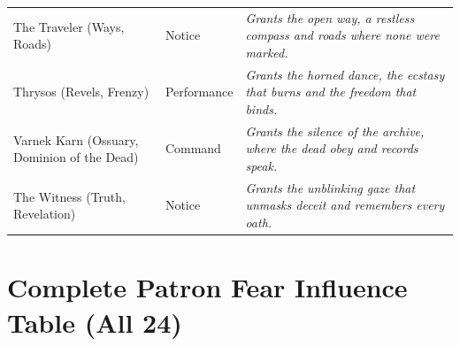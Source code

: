 \begin{longtable}{@{}p{4.2cm}p{3.2cm}p{7.2cm}@{}}
The Traveler (Ways, Roads) & Notice &
\emph{Grants the open way, a restless compass and roads where none were marked.} \\

Thrysos (Revels, Frenzy) & Performance &
\emph{Grants the horned dance, the ecstasy that burns and the freedom that binds.} \\

Varnek Karn (Ossuary, Dominion of the Dead) & Command &
\emph{Grants the silence of the archive, where the dead obey and records speak.} \\

The Witness (Truth, Revelation) & Notice &
\emph{Grants the unblinking gaze that unmasks deceit and remembers every oath.} \\

\end{longtable}

\caption{Complete Patron Gifts and Thematic Skills (24 patrons). The +1 bonus applies only when the fiction aligns with the Patron's domain.}

\section{Complete Patron Fear Influence Table (All 24)}
\label{app:full-fear-table}

